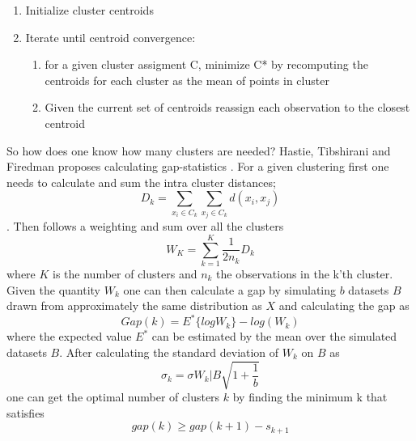\begin{enumerate}
	\item Initialize cluster centroids
	\item Iterate until centroid convergence:
		\begin{enumerate}
			\item for a given cluster assigment C, minimize C* by recomputing the centroids for each cluster as the mean of points in cluster
			\item Given the current set of centroids reassign each observation to the closest centroid
		\end{enumerate}
\end{enumerate}

So how does one know how many clusters are needed? Hastie, Tibshirani and Firedman proposes calculating gap-statistics \cite[p.~519]{statistical-learning}.
For a given clustering first one needs to calculate and sum the intra cluster distances;
\begin{equation}
D_k=\sum_{x_i\in C_k} \sum_{x_j\in C_k} d(x_i,x_j)
\end{equation}.
Then follows a weighting and sum over all the clusters
\begin{equation}
W_{K}=\sum_{k=1}^K \frac{1}{2n_k} D_k
\end{equation}
where $K$ is the number of clusters and $n_k$ the observations in the k'th cluster.
Given the quantity $W_k$ one can then calculate a gap by simulating $b$ datasets $B$ drawn from approximately the same distribution as $X$ and calculating the gap as
\begin{equation}
Gap(k)=E^{*}\{log W_k\} - log(W_k)
\end{equation}
where the expected value $E^{*}$ can be estimated by the mean over the simulated datasets $B$. 
After calculating the standard deviation of $W_k$ on $B$ as 
\begin{equation}
\sigma_k=\sigma{W_k | B}\sqrt{1+\frac{1}{b}}
\end{equation}
 one can get the optimal number of clusters $k$ by finding the minimum k that satisfies
\begin{equation}
gap(k)\ge gap(k+1)-s_{k+1}
\end{equation}